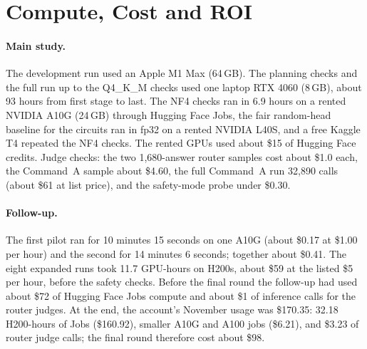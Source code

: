 \documentclass[11pt]{article}
\begin{document}
\section{Compute, Cost and ROI}\label{app:compute}

\paragraph{Main study.} The development run used an Apple M1 Max (64\,GB). The planning checks and the full run up
to the Q4\_K\_M checks used one laptop RTX 4060 (8\,GB), about 93 hours from first stage to last. The NF4 checks ran
in 6.9 hours on a rented NVIDIA A10G (24\,GB) through Hugging Face Jobs, the fair random-head baseline for the circuits
ran in fp32 on a rented NVIDIA L40S, and a free Kaggle T4 repeated the NF4 checks. The rented GPUs used about \$15 of
Hugging Face credits. Judge checks: the two 1,680-answer router samples cost about \$1.0 each, the Command~A sample
about \$4.60, the full Command~A run 32,890 calls (about \$61 at list price), and the safety-mode probe under \$0.30.

\paragraph{Follow-up.} The first pilot ran for 10 minutes 15 seconds on one A10G (about \$0.17 at \$1.00 per hour)
and the second for 14 minutes 6 seconds; together about \$0.41. The eight expanded runs took 11.7 GPU-hours on H200s,
about \$59 at the listed \$5 per hour, before the safety checks. Before the final round the follow-up had used about
\$72 of Hugging Face Jobs compute and about \$1 of inference calls for the router judges. At the end, the account's
November usage was \$170.35: 32.18 H200-hours of Jobs (\$160.92), smaller A10G and A100 jobs (\$6.21), and \$3.23
of router judge calls; the final round therefore cost about \$98.
\end{document}
